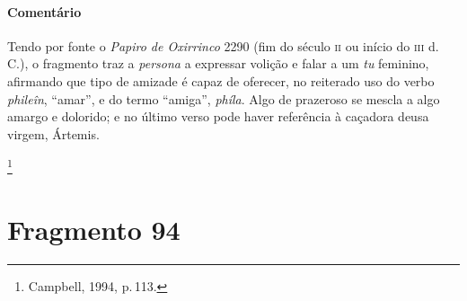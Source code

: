 {\paragraph{Comentário} Tendo por fonte o \emph{Papiro de Oxirrinco} 2290 (fim do século \textsc{ii} ou início do \textsc{iii} d.\,C.), o fragmento traz a \emph{persona} a expressar volição e falar a um \emph{tu} feminino, afirmando que tipo de amizade é capaz de oferecer, no reiterado uso do verbo \emph{phileîn}, ``amar'', e do termo ``amiga'', \emph{phíla}. Algo de prazeroso se mescla a algo amargo e dolorido; e no último verso pode haver 
referência à caçadora deusa virgem, Ártemis.}\footnote{Campbell, 1994, p.\,113.} 




\section{Fragmento 94}

